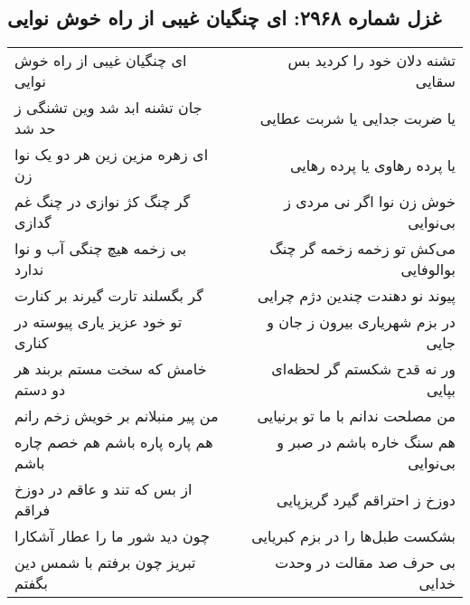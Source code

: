 \begin{center}
\section*{غزل شماره ۲۹۶۸: ای چنگیان غیبی از راه خوش نوایی}
\label{sec:2968}
\begin{longtable}{l p{0.5cm} r}
ای چنگیان غیبی از راه خوش نوایی
&&
تشنه دلان خود را کردید بس سقایی
\\
جان تشنه ابد شد وین تشنگی ز حد شد
&&
یا ضربت جدایی یا شربت عطایی
\\
ای زهره مزین زین هر دو یک نوا زن
&&
یا پرده رهاوی یا پرده رهایی
\\
گر چنگ کژ نوازی در چنگ غم گدازی
&&
خوش زن نوا اگر نی مردی ز بی‌نوایی
\\
بی زخمه هیچ چنگی آب و نوا ندارد
&&
می‌کش تو زخمه زخمه گر چنگ بوالوفایی
\\
گر بگسلند تارت گیرند بر کنارت
&&
پیوند نو دهندت چندین دژم چرایی
\\
تو خود عزیز یاری پیوسته در کناری
&&
در بزم شهریاری بیرون ز جان و جایی
\\
خامش که سخت مستم بربند هر دو دستم
&&
ور نه قدح شکستم گر لحظه‌ای بپایی
\\
من پیر منبلانم بر خویش زخم رانم
&&
من مصلحت ندانم با ما تو برنیایی
\\
هم پاره پاره باشم هم خصم چاره باشم
&&
هم سنگ خاره باشم در صبر و بی‌نوایی
\\
از بس که تند و عاقم در دوزخ فراقم
&&
دوزخ ز احتراقم گیرد گریزپایی
\\
چون دید شور ما را عطار آشکارا
&&
بشکست طبل‌ها را در بزم کبریایی
\\
تبریز چون برفتم با شمس دین بگفتم
&&
بی حرف صد مقالت در وحدت خدایی
\\
\end{longtable}
\end{center}
